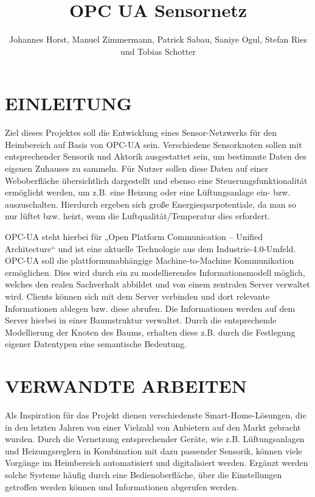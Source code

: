 \documentclass[letterpaper, 10 pt, conference]{ieeeconf}  %
\title{\LARGE \bf
OPC UA Sensornetz
}
\author{Johannes Horst, Manuel Zimmermann, Patrick Sabau, Saniye Ogul, Stefan Ries und Tobias Schotter}%
\begin{document}
\maketitle
\thispagestyle{empty}
\pagestyle{empty}

\section{EINLEITUNG}

Ziel dieses Projektes soll die Entwicklung eines Sensor-Netzwerks für den Heimbereich auf Basis von OPC-UA sein. 
Verschiedene Sensorknoten sollen mit entsprechender Sensorik und Aktorik ausgestattet sein, um bestimmte Daten des eigenen Zuhauses zu sammeln. 
Für Nutzer sollen diese Daten auf einer Weboberfläche übersichtlich dargestellt und ebenso eine Steuerungsfunktionalität ermöglicht werden, um z.B. eine Heizung oder eine Lüftungsanlage ein- bzw. auszuschalten. 
Hierdurch ergeben sich große Energiesparpotentiale, da man so nur lüftet bzw. heizt, wenn die Luftqualität/Temperatur dies erfordert.  

OPC-UA steht hierbei für „Open Platform Communication – Unified Architecture“ und ist eine aktuelle Technologie aus dem Industrie-4.0-Umfeld. OPC-UA soll die plattformunabhängige Machine-to-Machine Kommunikation ermöglichen. 
Dies wird durch ein zu modellierendes Informationsmodell möglich, welches den realen Sachverhalt abbildet und von einem zentralen Server verwaltet wird. 
Clients können sich mit dem Server verbinden und dort relevante Informationen ablegen bzw. diese abrufen. Die Informationen werden auf dem Server hierbei in einer Baumstruktur verwaltet. 
Durch die entsprechende Modellierung der Knoten des Baums, erhalten diese z.B. durch die Festlegung eigener Datentypen eine semantische Bedeutung.



\section{VERWANDTE ARBEITEN}

Als Inspiration für das Projekt dienen verschiedenste Smart-Home-Lösungen, die in den letzten Jahren von einer Vielzahl von Anbietern auf den Markt gebracht wurden. 
Durch die Vernetzung entsprechender Geräte, wie z.B. Lüftungsanlagen und Heizungsreglern in Kombination mit dazu passender Sensorik, können viele Vorgänge im Heimbereich automatisiert und digitalisiert werden. 
Ergänzt werden solche Systeme häufig durch eine Bedienoberfläche, über die Einstellungen getroffen werden können und Informationen abgerufen werden.
\end{document}
